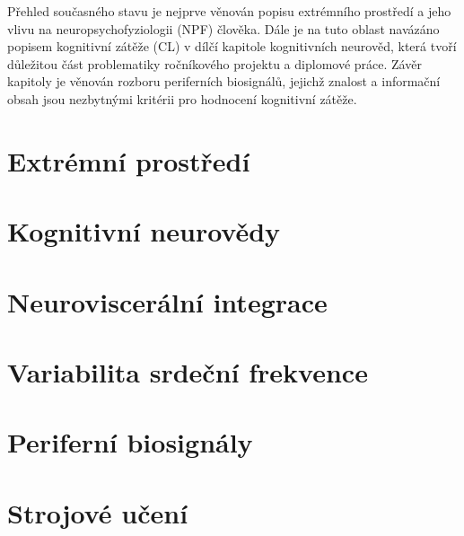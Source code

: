Přehled současného stavu je nejprve věnován popisu extrémního prostředí a jeho
vlivu na neuropsychofyziologii (\gls{NPF}) člověka. Dále je na tuto oblast
navázáno popisem kognitivní zátěže (\gls{CL}) v dílčí kapitole kognitivních
neurověd, která tvoří důležitou část problematiky ročníkového projektu a
diplomové práce. Závěr kapitoly je věnován rozboru periferních biosignálů,
jejichž znalost a informační obsah jsou nezbytnými kritérii pro hodnocení
kognitivní zátěže.

\section{Extrémní prostředí}
\label{sec:extreme_environment}


\section{Kognitivní neurovědy}
\label{sec:cognitive_neuroscience}


\section{Neuroviscerální integrace}
\label{sec:neurovisceralni_integrace}


\section{Variabilita srdeční frekvence}
\label{sec:hrv}


\section{Periferní biosignály}
\label{sec:peripheral_biosignals}


\section{Strojové učení}
\label{section:machine_learning}
